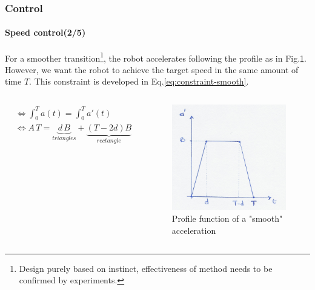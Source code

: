 \documentclass[10pt]{beamer}
\begin{document}
\begin{frame}
\frametitle{Control}
\framesubtitle{Speed control(2/5)}
For a smoother transition\footnote{Design purely based on instinct, effectiveness of method needs to be confirmed by experiments.}, the robot accelerates following the profile as in Fig.\ref{fig:smooth-acc}. However, we want the robot to achieve the target speed in the same amount of time $T$. This constraint is developed in Eq.\ref{eq:constraint-smooth}.
\begin{columns}[c]

\begin{equation}\label{eq:constraint-smooth}
\begin{aligned}
&\Leftrightarrow \int_{0}^{T}a(t) =  \int_{0}^{T}a'(t) \\
&\Leftrightarrow A\,T = \underbrace{d\,B}_{triangles} + \underbrace{(T - 2d)B}_{rectangle}
\end{aligned}
\end{equation}

\begin{figure}[hbtp]
\centering
\label{fig:smooth-acc}
\includegraphics[scale=0.07]{figures/smooth-acc}
\caption{Profile function of a "smooth" acceleration}
\end{figure}
\end{columns}
\end{frame}
\end{document}
